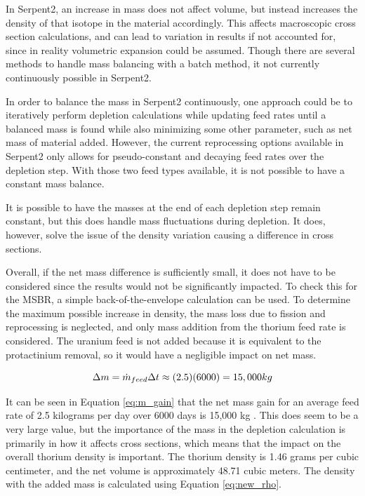In Serpent2, an increase in mass does not affect volume, but instead increases the density of that isotope in the material accordingly. This affects macroscopic cross section calculations, and can lead to variation in results if not accounted for, since in reality volumetric expansion could be assumed. Though there are several methods to handle mass balancing with a batch method, it not currently continuously possible in Serpent2.

In order to balance the mass in Serpent2 continuously, one approach could be to iteratively perform depletion calculations while updating feed rates until a balanced mass is found while also minimizing some other parameter, such as net mass of material added. However, the current reprocessing options available in Serpent2 only allows for pseudo-constant and decaying feed rates over the depletion step. With those two feed types available, it is not possible to have a constant mass balance.

It is possible to have the masses at the end of each depletion step remain constant, but this does handle mass fluctuations during depletion. It does, however, solve the issue of the density variation causing a difference in cross sections.

Overall, if the net mass difference is sufficiently small, it does not have to be considered since the results would not be significantly impacted. To check this for the MSBR, a simple back-of-the-envelope calculation can be used. To determine the maximum possible increase in density, the mass loss due to fission and reprocessing is neglected, and only mass addition from the thorium feed rate is considered. The uranium feed is not added because it is equivalent to the protactinium removal, so it would have a negligible impact on net mass. 

\begin{equation} \hfill
\Delta m = \Dot{m}_{feed} \Delta t \approx (2.5)(6000) = 15,000 kg
\hfill\label{eq:m_gain} \end{equation}

It can be seen in Equation \eqref{eq:m_gain} that the net mass gain for an average feed rate of 2.5 kilograms per day over 6000 days is 15,000 kg \cite{rykhlevskii_fuel_2020, betzler_molten_2017}. This does seem to be a very large value, but the importance of the mass in the depletion calculation is primarily in how it affects cross sections, which means that the impact on the overall thorium density is important. The thorium density is 1.46 grams per cubic centimeter, and the net volume is approximately 48.71 cubic meters. The density with the added mass is calculated using Equation \eqref{eq:new_rho}.

